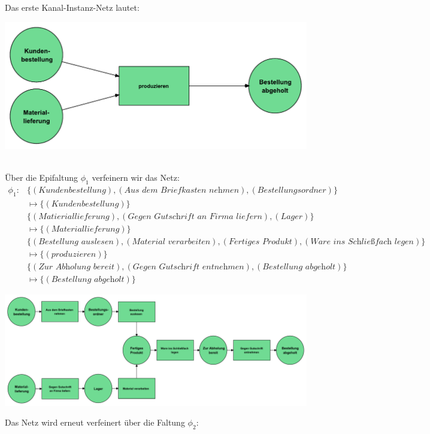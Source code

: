 \documentclass[12pt,a4paper]{../krautsourcing/homework}
\begin{document}
Das erste Kanal-Instanz-Netz lautet:\\
\centerline{
\includegraphics[scale=0.5,trim={0mm 0mm 0mm 0mm},clip]{Aufgabe_7-5/Aufgabe_7-5-1-1.pdf}
}\\
Über die Epifaltung \(\phi_1\) verfeinern wir das Netz:\\
\(
\begin{aligned}
\phi_1:
&\{(\textit{Kundenbestellung}), (\textit{Aus dem Briefkasten nehmen}), (\textit{Bestellungsordner})\}\\
&\mapsto \{(\textit{Kundenbestellung})\}\\
&\{(\textit{Matieriallieferung}), (\textit{Gegen Gutschrift an Firma liefern}), (\textit{Lager})\} \\
&\mapsto \{(\textit{Materiallieferung})\}\\
&\{(\textit{Bestellung auslesen}), (\textit{Material verarbeiten}), (\textit{Fertiges Produkt}), (\textit{Ware ins Schließfach legen})\} \\
&\mapsto \{(\textit{produzieren})\}\\
&\{(\textit{Zur Abholung bereit}), (\textit{Gegen Gutschrift entnehmen}), (\textit{Bestellung abgeholt})\} \\
&\mapsto \{(\textit{Bestellung abgeholt})\}
\end{aligned}
\)
\centerline{
\includegraphics[scale=0.45,trim={0mm 0mm 0mm 0mm},clip]{Aufgabe_7-5/Aufgabe_7-5-1-2.pdf}
}
Das Netz wird erneut verfeinert über die Faltung \(\phi_2\):\\
\end{document}
